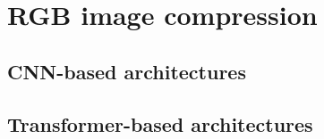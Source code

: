 \section{RGB image compression \label{sec:ch2rgb}}
\subsection{CNN-based architectures}
\subsection{Transformer-based architectures}